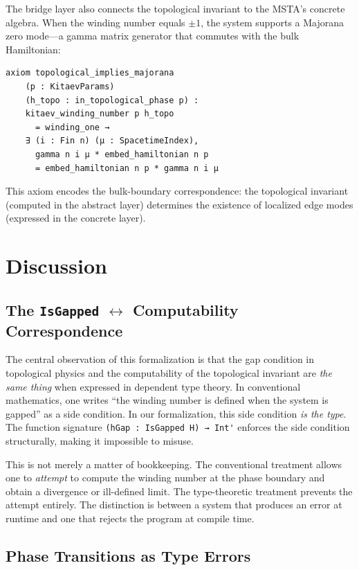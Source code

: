 \documentclass[11pt,a4paper]{article}
\newcommand{\lean}[1]{\lstinline[language=Lean4]{#1}}
\begin{document}
The bridge layer also connects the topological invariant to the MSTA's concrete algebra. When the winding number equals $\pm 1$, the system supports a Majorana zero mode---a gamma matrix generator that commutes with the bulk Hamiltonian:

\begin{lstlisting}
axiom topological_implies_majorana
    (p : KitaevParams)
    (h_topo : in_topological_phase p) :
    kitaev_winding_number p h_topo
      = winding_one →
    ∃ (i : Fin n) (μ : SpacetimeIndex),
      gamma n i μ * embed_hamiltonian n p
      = embed_hamiltonian n p * gamma n i μ
\end{lstlisting}

This axiom encodes the bulk-boundary correspondence: the topological invariant (computed in the abstract layer) determines the existence of localized edge modes (expressed in the concrete layer).

\section{Discussion}

\subsection{The \texorpdfstring{\texttt{IsGapped}}{IsGapped} $\leftrightarrow$ Computability Correspondence}

The central observation of this formalization is that the gap condition in topological physics and the computability of the topological invariant are \emph{the same thing} when expressed in dependent type theory. In conventional mathematics, one writes ``the winding number is defined when the system is gapped'' as a side condition. In our formalization, this side condition \emph{is the type}. The function signature \lean{(hGap : IsGapped H) → Int'} enforces the side condition structurally, making it impossible to misuse.

This is not merely a matter of bookkeeping. The conventional treatment allows one to \emph{attempt} to compute the winding number at the phase boundary and obtain a divergence or ill-defined limit. The type-theoretic treatment prevents the attempt entirely. The distinction is between a system that produces an error at runtime and one that rejects the program at compile time.

\subsection{Phase Transitions as Type Errors}
\end{document}
